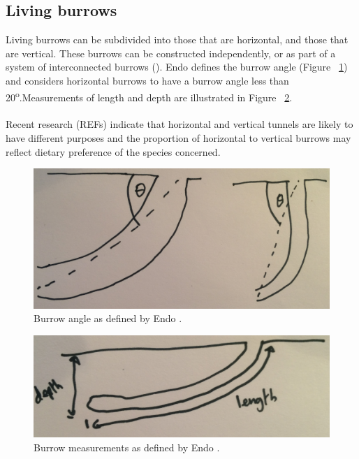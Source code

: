 \documentclass{article}
\begin{document}
   \subsection{Living burrows}
   Living burrows can be subdivided into those that are horizontal, and those that are vertical. These burrows can be constructed independently, or as part of a system of interconnected burrows (\cite{endo2007}). Endo \cite{endo2007} defines the burrow angle (Figure ~\ref{fig:living_burrow_angle}) and considers horizontal burrows to have a burrow angle less than 20\textsuperscript{o}.Measurements of length and depth are illustrated in Figure ~\ref{fig:living_measurements}.
   \paragraph{}
   Recent research (REFs) indicate that horizontal and vertical tunnels are likely to have different purposes and the proportion of horizontal to vertical burrows may reflect dietary preference of the species concerned.  
    \begin{figure}[h]
   	\includegraphics[width=\textwidth]{living_burrow_angle}
   	\caption{Burrow angle as defined by Endo \cite{endo2007}.}
   	\label{fig:living_burrow_angle}
   \end{figure}
   \begin{figure}[h]
   	\includegraphics[width=\textwidth]{living_measurements}
   	\caption{Burrow measurements as defined by Endo \cite{endo2007}.}
   	\label{fig:living_measurements}
   \end{figure}
\end{document}
